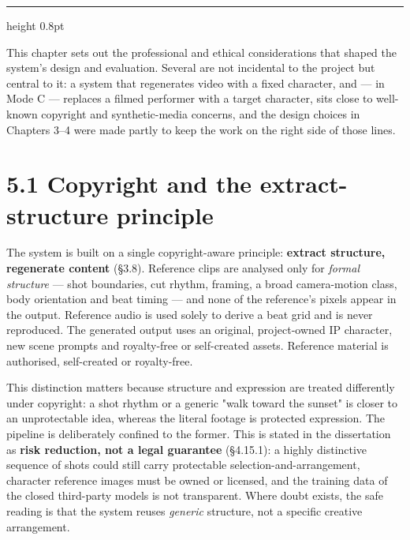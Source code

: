\documentclass[10pt,twocolumn,letterpaper]{article}
\begin{document}
\par\vspace{22pt}

\vspace*{2pt}\vspace{3pt}\hrule height 0.8pt\vspace{12pt}

This chapter sets out the professional and ethical considerations that shaped the system's design and evaluation. Several are not incidental to the project but central to it: a system that regenerates video with a fixed character, and --- in Mode C --- replaces a filmed performer with a target character, sits close to well-known copyright and synthetic-media concerns, and the design choices in Chapters 3--4 were made partly to keep the work on the right side of those lines.


\section*{5.1 Copyright and the extract-structure principle}

The system is built on a single copyright-aware principle: \textbf{extract structure, regenerate content} (\S{}3.8). Reference clips are analysed only for \emph{formal structure} --- shot boundaries, cut rhythm, framing, a broad camera-motion class, body orientation and beat timing --- and none of the reference's pixels appear in the output. Reference audio is used solely to derive a beat grid and is never reproduced. The generated output uses an original, project-owned IP character, new scene prompts and royalty-free or self-created assets. Reference material is authorised, self-created or royalty-free.

This distinction matters because structure and expression are treated differently under copyright: a shot rhythm or a generic "walk toward the sunset" is closer to an unprotectable idea, whereas the literal footage is protected expression. The pipeline is deliberately confined to the former. This is stated in the dissertation as \textbf{risk reduction, not a legal guarantee} (\S{}4.15.1): a highly distinctive sequence of shots could still carry protectable selection-and-arrangement, character reference images must be owned or licensed, and the training data of the closed third-party models is not transparent. Where doubt exists, the safe reading is that the system reuses \emph{generic} structure, not a specific creative arrangement.
\end{document}
